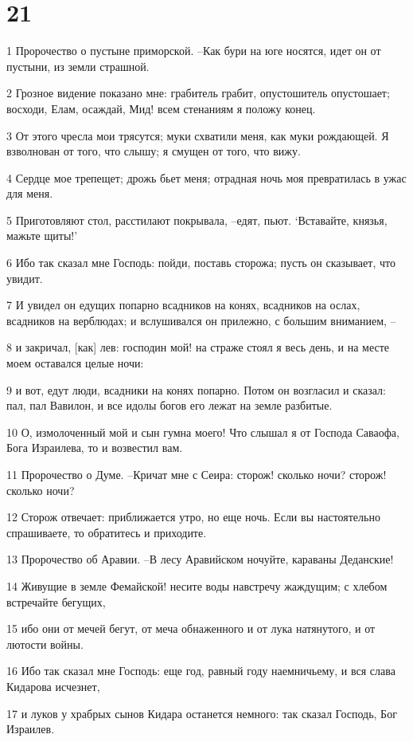 \chapter{21}

\par 1 Пророчество о пустыне приморской. --Как бури на юге носятся, идет он от пустыни, из земли страшной.
\par 2 Грозное видение показано мне: грабитель грабит, опустошитель опустошает; восходи, Елам, осаждай, Мид! всем стенаниям я положу конец.
\par 3 От этого чресла мои трясутся; муки схватили меня, как муки рождающей. Я взволнован от того, что слышу; я смущен от того, что вижу.
\par 4 Сердце мое трепещет; дрожь бьет меня; отрадная ночь моя превратилась в ужас для меня.
\par 5 Приготовляют стол, расстилают покрывала, --едят, пьют. `Вставайте, князья, мажьте щиты!'
\par 6 Ибо так сказал мне Господь: пойди, поставь сторожа; пусть он сказывает, что увидит.
\par 7 И увидел он едущих попарно всадников на конях, всадников на ослах, всадников на верблюдах; и вслушивался он прилежно, с большим вниманием, --
\par 8 и закричал, [как] лев: господин мой! на страже стоял я весь день, и на месте моем оставался целые ночи:
\par 9 и вот, едут люди, всадники на конях попарно. Потом он возгласил и сказал: пал, пал Вавилон, и все идолы богов его лежат на земле разбитые.
\par 10 О, измолоченный мой и сын гумна моего! Что слышал я от Господа Саваофа, Бога Израилева, то и возвестил вам.
\par 11 Пророчество о Думе. --Кричат мне с Сеира: сторож! сколько ночи? сторож! сколько ночи?
\par 12 Сторож отвечает: приближается утро, но еще ночь. Если вы настоятельно спрашиваете, то обратитесь и приходите.
\par 13 Пророчество об Аравии. --В лесу Аравийском ночуйте, караваны Деданские!
\par 14 Живущие в земле Фемайской! несите воды навстречу жаждущим; с хлебом встречайте бегущих,
\par 15 ибо они от мечей бегут, от меча обнаженного и от лука натянутого, и от лютости войны.
\par 16 Ибо так сказал мне Господь: еще год, равный году наемничьему, и вся слава Кидарова исчезнет,
\par 17 и луков у храбрых сынов Кидара останется немного: так сказал Господь, Бог Израилев.

